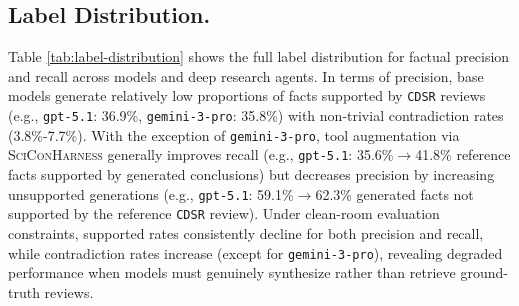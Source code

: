 \documentclass{article}
\begin{document}
\subsection{Label Distribution.}\label{appendix:label-distribution} Table \ref{tab:label-distribution} shows the full label distribution for factual precision and recall across models and deep research agents. In terms of precision, base models generate relatively low proportions of facts supported by \texttt{CDSR} reviews (e.g., \texttt{gpt-5.1}: 36.9\%, \texttt{gemini-3-pro}: 35.8\%) with non-trivial contradiction rates (3.8\%-7.7\%). With the exception of \texttt{gemini-3-pro}, tool augmentation via \textsc{SciConHarness} generally improves recall (e.g., \texttt{gpt-5.1}: 35.6\%$\rightarrow$41.8\% reference facts supported by generated conclusions) but decreases precision by increasing unsupported generations (e.g., \texttt{gpt-5.1}: 59.1\%$\rightarrow$62.3\% generated facts not supported by the reference \texttt{CDSR} review). Under clean-room evaluation constraints, supported rates consistently decline for both precision and recall, while contradiction rates increase (except for \texttt{gemini-3-pro}), revealing degraded performance when models must genuinely synthesize rather than retrieve ground-truth reviews.
\end{document}

